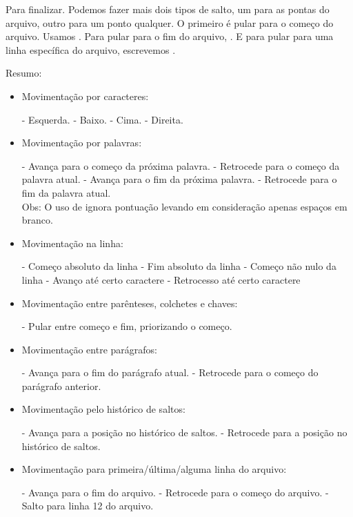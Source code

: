 Para finalizar.
Podemos fazer mais dois tipos de salto, um para as pontas do arquivo, outro para um ponto qualquer.
O primeiro é pular para o começo do arquivo.
Usamos .
Para pular para o fim do arquivo, .
E para pular para uma linha específica do arquivo, escrevemos .

Resumo:
\begin{itemize}
    \item Movimentação por caracteres:

        \subitem {} - Esquerda.
        \subitem {} - Baixo.
        \subitem {} - Cima.
        \subitem {} - Direita.

    \item Movimentação por palavras:

        \subitem {}  - Avança para o começo da próxima palavra.
        \subitem {}  - Retrocede para o começo da palavra atual.
        \subitem {} - Avança para o fim da próxima palavra.
        \subitem {} - Retrocede para o fim da palavra atual.\\
        Obs: O uso de  ignora pontuação levando em consideração apenas espaços em branco.

    \item Movimentação na linha:

        \subitem {} - Começo absoluto da linha
        \subitem \vimcommand{\$} - Fim absoluto da linha
        \subitem \vimcommand{\^} - Começo não nulo da linha
        \subitem {} - Avanço até certo caractere
        \subitem {} - Retrocesso até certo caractere

    \item Movimentação entre parênteses, colchetes e chaves:

        \subitem \vimcommand{\%} - Pular entre começo e fim, priorizando o começo.

    \item Movimentação entre parágrafos:

        \subitem \vimcommand{\}} - Avança para o fim do parágrafo atual.
        \subitem \vimcommand{\{} - Retrocede para o começo do parágrafo anterior.

    \item Movimentação pelo histórico de saltos:

        \subitem {} - Avança para a posição no histórico de saltos.
        \subitem {} - Retrocede para a posição no histórico de saltos.

    \item Movimentação para primeira/última/alguma linha do arquivo:

        \subitem {} - Avança para o fim do arquivo.
        \subitem {} - Retrocede para o começo do arquivo.
        \subitem {} - Salto para linha 12 do arquivo.

\end{itemize}
    
